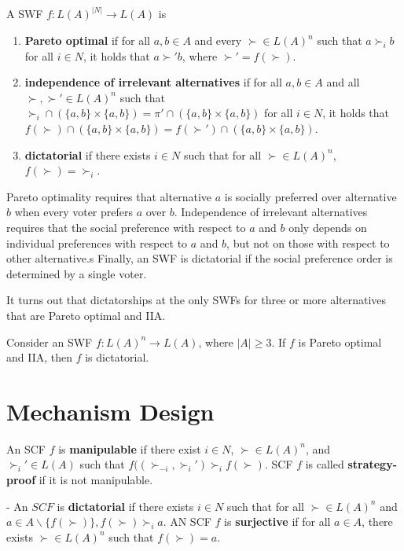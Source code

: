 \begin{defn}
  \label{sec:social-choice-4}
  A SWF $f: L(A)^{|N|} \rightarrow L(A)$ is
  \begin{enumerate}
  \item \textbf{Pareto optimal} if for all $a, b \in A$ and every
    $\succ \in L(A)^{n}$ such that $a \succ_{i} b$ for all $i \in N$,
    it holds that $a \succ' b$, where $\succ' = f(\succ)$.
  \item \textbf{independence of irrelevant alternatives} if for all
    $a, b \in A$ and all $\succ, \succ' \in L(A)^{n}$ such that
    $\succ_{i} \cap (\{ a, b \} \times \{ a, b \} ) = \pi' \cap (\{ a,
    b \} \times \{ a, b \}   )$ for all $i \in N$, it holds that
    $f(\succ) \cap ( \{ a, b \} \times \{ a, b \} ) = f(\succ') \cap (
    \{ a, b \}  \times \{ a, b \} )$.
  \item \textbf{dictatorial} if there exists $i \in N$ such that for
    all $\succ \in L(A)^{n}$, $f(\succ) = \succ_{i}$.
  \end{enumerate}

  Pareto optimality requires that alternative $a$ is socially
  preferred over alternative $b$ when every voter prefers $a$ over
  $b$.  Independence of irrelevant alternatives requires that the
  social preference with respect to $a$ and $b$ only depends on
  individual preferences with respect to $a$ and $b$, but not on those
  with respect to other alternative.s  Finally, an SWF is dictatorial
  if the social preference order is determined by a single voter.


\end{defn}

It turns out that dictatorships at the only SWFs for three or more
alternatives that are Pareto optimal and IIA.

\begin{thm}
  \label{sec:social-choice-5}
  Consider an SWF $f: L(A)^{n} \rightarrow L(A)$, where $|A| \geq 3$.
  If $f$ is Pareto optimal and IIA, then $f$ is dictatorial.
\end{thm}

\section{Mechanism Design}
\label{sec:mecahnism-design}

\begin{defn}
  \label{sec:mecahnism-design-1}
  An SCF $f$ is \textbf{manipulable} if there exist $i \in N$, $\succ
  \in L(A)^{n}$, and $\succ_{i}' \in L(A)$ such that $f((\succ_{-i},
  \succ_{i}') \succ_{i} f(\succ)$.
  SCF $f$ is called
  \textbf{strategy-proof} if it is not manipulable.

-  An $SCF$ is \textbf{dictatorial} if there exists $i \in N$ such
  that for all $\succ \in L(A)^{n}$ and $a \in A \backslash \{
  f(\succ) \}, f(\succ) \succ_{i} a$.  AN SCF $f$ is
  \textbf{surjective} if for all $a \in A$, there exists $\succ \in
  L(A)^{n}$ such that $f(\succ) = a$.
\end{defn}

